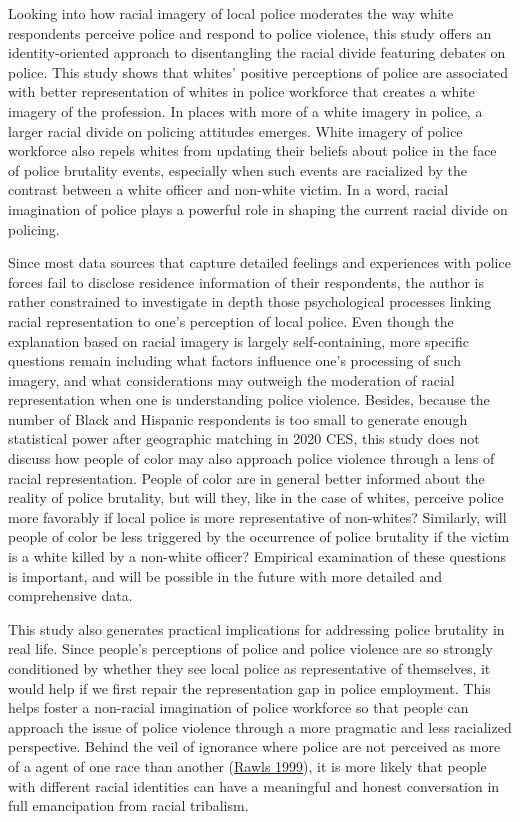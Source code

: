 \documentclass[
  12pt,
]{article}
\begin{document}
Looking into how racial imagery of local police moderates the way white
respondents perceive police and respond to police violence, this study
offers an identity-oriented approach to disentangling the racial divide
featuring debates on police. This study shows that whites' positive
perceptions of police are associated with better representation of
whites in police workforce that creates a white imagery of the
profession. In places with more of a white imagery in police, a larger
racial divide on policing attitudes emerges. White imagery of police
workforce also repels whites from updating their beliefs about police in
the face of police brutality events, especially when such events are
racialized by the contrast between a white officer and non-white victim.
In a word, racial imagination of police plays a powerful role in shaping
the current racial divide on policing.

Since most data sources that capture detailed feelings and experiences
with police forces fail to disclose residence information of their
respondents, the author is rather constrained to investigate in depth
those psychological processes linking racial representation to one's
perception of local police. Even though the explanation based on racial
imagery is largely self-containing, more specific questions remain
including what factors influence one's processing of such imagery, and
what considerations may outweigh the moderation of racial representation
when one is understanding police violence. Besides, because the number
of Black and Hispanic respondents is too small to generate enough
statistical power after geographic matching in 2020 CES, this study does
not discuss how people of color may also approach police violence
through a lens of racial representation. People of color are in general
better informed about the reality of police brutality, but will they,
like in the case of whites, perceive police more favorably if local
police is more representative of non-whites? Similarly, will people of
color be less triggered by the occurrence of police brutality if the
victim is a white killed by a non-white officer? Empirical examination
of these questions is important, and will be possible in the future with
more detailed and comprehensive data.

This study also generates practical implications for addressing police
brutality in real life. Since people's perceptions of police and police
violence are so strongly conditioned by whether they see local police as
representative of themselves, it would help if we first repair the
representation gap in police employment. This helps foster a non-racial
imagination of police workforce so that people can approach the issue of
police violence through a more pragmatic and less racialized
perspective. Behind the veil of ignorance where police are not perceived
as more of a agent of one race than another
(\protect\hyperlink{ref-rawls1999}{Rawls 1999}), it is more likely that
people with different racial identities can have a meaningful and honest
conversation in full emancipation from racial tribalism.
\end{document}
